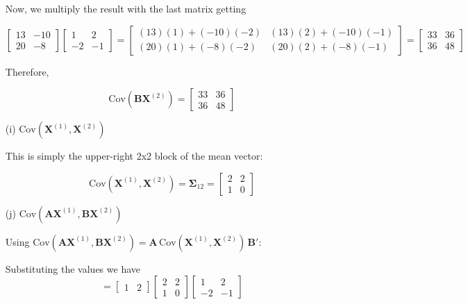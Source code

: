 \documentclass[12pt]{article}
\begin{document}
\begin{enumerate}
Now, we multiply the result with the last matrix getting

$$
\begin{bmatrix} 13 & -10 \\ 20 & -8 \end{bmatrix}
\begin{bmatrix} 1 & 2 \\ -2 & -1 \end{bmatrix}
=
\begin{bmatrix} (13)(1)+(-10)(-2) & (13)(2)+(-10)(-1) \\ (20)(1)+(-8)(-2) & (20)(2)+(-8)(-1) \end{bmatrix} = \begin{bmatrix} 33 & 36 \\ 36 & 48 \end{bmatrix}
$$

Therefore,

$$
\boxed{
\text{Cov}(\mathbf{B}\mathbf{X}^{(2)}) = \begin{bmatrix} 33 & 36 \\ 36 & 48 \end{bmatrix}
}
$$

\item[(i)] $\text{Cov}(\mathbf{X}^{(1)}, \mathbf{X}^{(2)})$

\noindent This is simply the upper-right 2x2 block of the mean vector:

$$
\boxed{
\text{Cov}(\mathbf{X}^{(1)}, \mathbf{X}^{(2)}) = \boldsymbol{\Sigma}_{12} = \begin{bmatrix} 2 & 2 \\ 1 & 0 \end{bmatrix}
}
$$

\item[(j)] $\text{Cov}(\mathbf{A}\mathbf{X}^{(1)}, \mathbf{B}\mathbf{X}^{(2)})$

\vspace{0.5em}

\noindent Using $\text{Cov}(\mathbf{A}\mathbf{X}^{(1)}, \mathbf{B}\mathbf{X}^{(2)}) = \mathbf{A}\,\text{Cov}(\mathbf{X}^{(1)},\mathbf{X}^{(2)})\,\mathbf{B}'$:

Substituting the values we have 
$$
= \begin{bmatrix} 1 & 2 \end{bmatrix} \begin{bmatrix} 2 & 2 \\ 1 & 0 \end{bmatrix} \begin{bmatrix} 1 & 2 \\ -2 & -1 \end{bmatrix}
$$


\end{enumerate}
\end{document}
